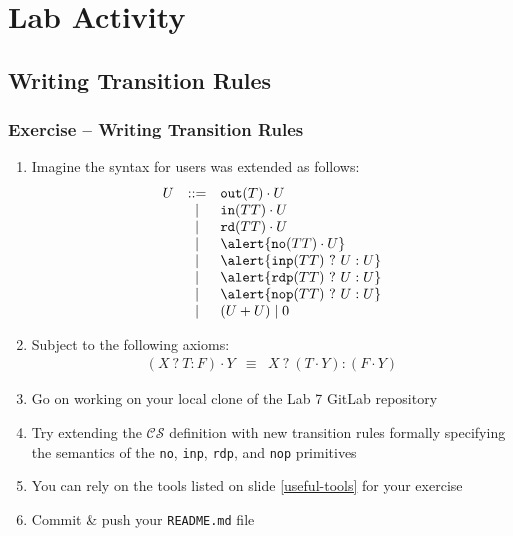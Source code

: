 \documentclass[presentation]{beamer}\mode<presentation>{\usetheme{AMSCesenaPurpleAndGold}}
\newcommand{\labN}{7}
\begin{document}
\section{Lab Activity}

\startExercise

\subsection{Writing Transition Rules}

\begin{frame}[allowframebreaks]
\frametitle{Exercise \currentExercise{} -- Writing Transition Rules}
    
    \begin{enumerate}
        \item<1-> Imagine the syntax for users was extended as follows:
        \[\begin{array}{rcl}
            U &::=& \mathtt{out}(T) \cdot U \\
            &\mid& \mathtt{in}(TT) \cdot U \\
            &\mid& \mathtt{rd}(TT) \cdot U \\
            &\mid& \alert{\mathtt{no}(TT) \cdot U} \\
            &\mid& \alert{\mathtt{inp}(TT)\ ?\ U : U} \\
            &\mid& \alert{\mathtt{rdp}(TT)\ ?\ U : U} \\
            &\mid& \alert{\mathtt{nop}(TT)\ ?\ U : U} \\
            &\mid& (U + U) \mid 0
        \end{array}\]

        \bigskip
        
        \item Subject to the following axioms:
        \[\begin{array}{rcl}
            (X\ ?\ T : F) \cdot Y &\equiv& X\ ?\ (T \cdot Y) : (F \cdot Y)
        \end{array}\]

        \framebreak

        \item Go on working on your local clone of the Lab \labN{} GitLab repository
        
        \bigskip
        
        \item Try extending the $\mathcal{CS}$ definition with new transition rules formally specifying the semantics of the \texttt{no}, \texttt{inp}, \texttt{rdp}, and \texttt{nop} primitives 
        
        \bigskip
        
        \item You can rely on the tools listed on slide \ref{useful-tools} for your exercise
        
        \bigskip
        
        \item Commit \& push your \texttt{README.md} file
        
    \end{enumerate}

\end{frame}
\end{document}
